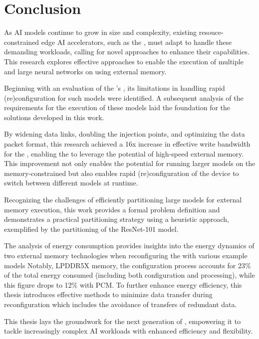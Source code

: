 \section{Conclusion}
As AI models continue to grow in size and complexity, existing resouce-constrained edge AI accelerators, such as the \graicore{}, must adapt to handle these demanding workloads, calling for novel approaches to enhance their capabilities.
This research explores effective approaches to enable the execution of multiple and large neural networks on \graicore{} using external memory.

Beginning with an evaluation of the \graicore{}'s \confignoc{}, its limitations in handling rapid (re)configuration for such models were identified.
A subsequent analysis of the requirements for the execution of these models laid the foundation for the solutions developed in this work.

By widening data links, doubling the injection points, and optimizing the data packet format, this research achieved a 16x increase in effective write bandwidth for the \confignoc{}, enabling the \graicore{} to leverage the potential of high-speed external memory.
This improvement not only enables the potential for running larger models on the memory-constrained \graicore{} but also enables rapid (re)configuration of the device to switch between different models at runtime.

Recognizing the challenges of efficiently partitioning large models for external memory execution, this work provides a formal problem definition and demonstrates a practical partitioning strategy using a heuristic approach, exemplified by the partitioning of the ResNet-101 model.

The analysis of energy consumption provides insights into the energy dynamics of two external memory technologies when reconfiguring the \graicore{} with various example models
Notably, LPDDR5X memory, the configuration process accounts for 23\% of the total energy consumed (including both configuration and processing), while this figure drops to 12\% with PCM.
To further enhance energy efficiency, this thesis introduces effective methods to minimize data transfer during reconfiguration which includes the avoidance of transfers of redundant data.

This thesis lays the groundwork for the next generation of \graicore{}, empowering it to tackle increasingly complex AI workloads with enhanced efficiency and flexibility.
